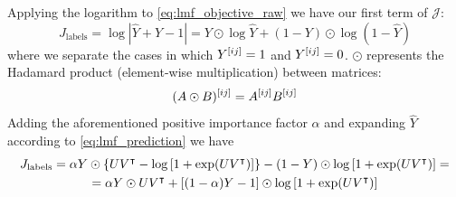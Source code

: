 Applying the logarithm to \autoref{eq:lmf_objective_raw} we have our first term of $\mathcal{J}$:
%
\begin{equation*}
    J_\text{labels} = \log |\hat Y + Y - 1| = Y \odot \log \hat Y + (1 - Y) \odot \log (1 - \hat Y)
\end{equation*}
%
where we separate the cases in which $Y^{[ij]} = 1$ and $Y^{[ij]} = 0$. $\odot$ represents the Hadamard product (element-wise multiplication) between matrices:
%
\begin{equation*}
    (A \odot B)^{[ij]} = A^{[ij]} B^{[ij]}
\end{equation*}
%
Adding the aforementioned positive importance factor $\alpha$ and expanding $\hat Y$ according to \autoref{eq:lmf_prediction} we have
%
%
\begin{multline}
    J_\text{labels} =
        \alpha Y \odot \left\{UV^\intercal - \log\left[1 + \exp(UV^\intercal)\right]\right\} 
        - (1 - Y) \odot \log \left[1 + \exp(UV^\intercal)\right]
    =\\
    =
        \alpha Y \odot UV^\intercal
        + [(1 - \alpha) Y - 1] \odot \log \left[1+\exp(UV^\intercal)\right]
\end{multline}

